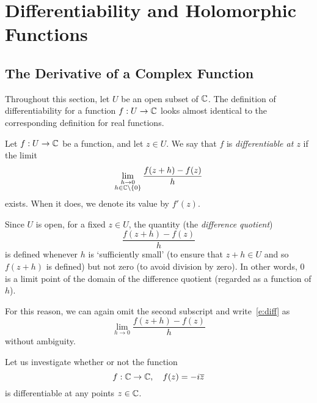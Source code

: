 
\chapter[Holomorphic Functions]{Differentiability and Holomorphic Functions}
\section{The Derivative of a Complex Function}
Throughout this section, let $U$ be an open subset of $\mathbb{C}$.  The definition of differentiability for a function $f: U \to \mathbb{C}$ looks almost identical to the corresponding definition for real functions.

\begin{definition}
Let $f: U \to \mathbb{C}$ be a function, and let $z \in U$.  We say that $f$ is \emph{differentiable at $z$} if the limit
\begin{equation}
\label{e:diff}
\lim_{\substack{h \to 0\\ h \in \mathbb{C} \backslash \left\{0\right\}}} \frac{f(z+h)-f(z)}{h}
\end{equation}
exists.  When it does, we denote its value by $f'(z)$.

\end{definition}

Since $U$ is open, for a fixed $z \in U$, the quantity (the \emph{difference quotient})
\[
\frac{f(z+h)-f(z)}{h}
\]
is defined whenever $h$ is `sufficiently small' (to ensure that $z+h \in U$ and so $f(z+h)$ is defined) but not zero (to avoid division by zero). In other words, $0$ is a limit point of the domain of the difference quotient (regarded as a function of $h$).

 For this reason, we can again omit the second subscript and write~\eqref{e:diff} as
\[
\lim_{h \to 0} \frac{f(z+h)-f(z)}{h}
\]
without ambiguity.




\begin{example}
\label{e:diff1}
Let us investigate whether or not the function
\[
f:\mathbb{C} \to \mathbb{C}, \quad f(z)=-i\overline{z}
\]
is differentiable at any points $z \in \mathbb{C}$.
\end{example}

